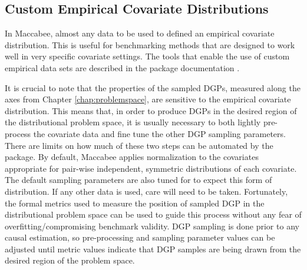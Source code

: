 \documentclass[../main.tex]{subfiles}
\begin{document}
\subsection{Custom Empirical Covariate Distributions}

 In Maccabee, almost any data to be used to defined an empirical covariate distribution. This is useful for benchmarking methods that are designed to work well in very specific covariate settings. The tools that enable the use of custom empirical data sets are described in the package documentation .

 \vspace{\baselineskip}

 It is crucial to note that the properties of the sampled DGPs, measured along the axes from Chapter \ref{chap:problemspace}, are sensitive to the empirical covariate distribution. This means that, in order to produce DGPs in the desired region of the distributional problem space, it is usually necessary to both lightly pre-process the covariate data and fine tune the other DGP sampling parameters. There are limits on how much of these two steps can be automated by the package. By default, Maccabee applies normalization to the covariates appropriate for pair-wise independent, symmetric distributions of each covariate. The default sampling parameters are also tuned for to expect this form of distribution. If any other data is used, care will need to be taken. Fortunately, the formal metrics used to measure the position of sampled DGP in the distributional problem space can be used to guide this process without any fear of overfitting/compromising benchmark validity. DGP sampling is done prior to any causal estimation, so pre-processing and sampling parameter values can be adjusted until metric values indicate that DGP samples are being drawn from the desired region of the problem space.

\vspace{\baselineskip}
\end{document}
